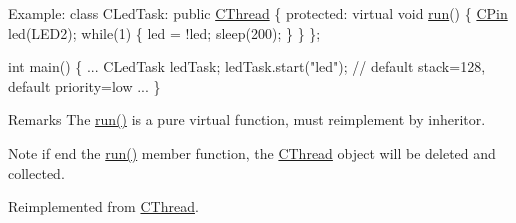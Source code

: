 \begin{DoxyCode}
Example:
        \textcolor{keyword}{class }CLedTask: \textcolor{keyword}{public} \hyperlink{class_c_thread}{CThread} \{
        \textcolor{keyword}{protected}:
            \textcolor{keyword}{virtual} \textcolor{keywordtype}{void} \hyperlink{class_c_debug_a9a3e40cc8ee5d0c2a41577f658779c71}{run}() \{
                \hyperlink{class_c_pin}{CPin} led(LED2);
                \textcolor{keywordflow}{while}(1) \{
                    led = !led;
                    sleep(200);
                \}
            \}
        \};

        \textcolor{keywordtype}{int} main() \{
            ...
            CLedTask ledTask;
            ledTask.start(\textcolor{stringliteral}{"led"});   \textcolor{comment}{// default stack=128, default priority=low}
            ...
        \}
\end{DoxyCode}
 \begin{DoxyRemark}{Remarks}
The \hyperlink{class_c_debug_a9a3e40cc8ee5d0c2a41577f658779c71}{run()} is a pure virtual function, must reimplement by inheritor. 
\end{DoxyRemark}
\begin{DoxyNote}{Note}
if end the \hyperlink{class_c_debug_a9a3e40cc8ee5d0c2a41577f658779c71}{run()} member function, the \hyperlink{class_c_thread}{C\-Thread} object will be deleted and collected. 
\end{DoxyNote}


Reimplemented from \hyperlink{class_c_thread_a071c3d3b3c19a7bd6a01aca073a9b4d7}{C\-Thread}.




